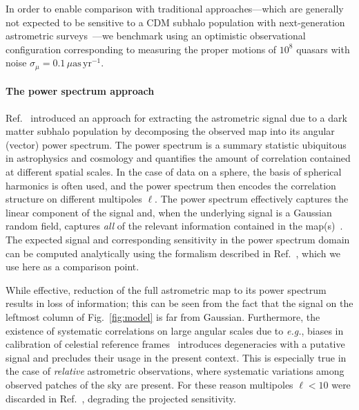 \documentclass[preprint]{article}
\begin{document}
In order to enable comparison with traditional approaches---which are generally not expected to be sensitive to a CDM subhalo population with next-generation astrometric surveys~\cite{VanTilburg:2018ykj,Mishra-Sharma:2020ynk}---we benchmark using an optimistic observational configuration corresponding to measuring the proper motions of $10^8$ quasars with noise $\sigma_{\mu} = 0.1\,\mu\mathrm{as}\,\mathrm{yr}^{-1}$.

\paragraph{The power spectrum approach} Ref.~\cite{Mishra-Sharma:2020ynk} introduced an approach for extracting the astrometric signal due to a dark matter subhalo population by decomposing the observed map into its angular (vector) power spectrum. The power spectrum is a summary statistic ubiquitous in astrophysics and cosmology and quantifies the amount of correlation contained at different spatial scales. In the case of data on a sphere, the basis of spherical harmonics is often used, and the power spectrum then encodes the correlation structure on different multipoles $\ell$. The power spectrum effectively captures the linear component of the signal and, when the underlying signal is a Gaussian random field, captures \emph{all} of the relevant information contained in the map(s)~\cite{Tegmark:1996qt}.
The expected signal and corresponding sensitivity in the power spectrum domain can be computed analytically using the formalism described in Ref.~\cite{Mishra-Sharma:2020ynk}, which we use here as a comparison point. 

While effective, reduction of the full astrometric map to its power spectrum results in loss of information; this can be seen from the fact that the signal on the leftmost column of Fig.~\ref{fig:model} is far from Gaussian. Furthermore, the existence of systematic correlations on large angular scales due to \emph{e.g.}, biases in calibration of celestial reference frames~\cite{2018A&A...616A..14G} introduces degeneracies with a putative signal and precludes their usage in the present context. This is especially true in the case of \emph{relative} astrometric observations, where systematic variations among observed patches of the sky are present. For these reason multipoles $\ell < 10$ were discarded in Ref.~\cite{Mishra-Sharma:2020ynk}, degrading the projected sensitivity.
\end{document}
